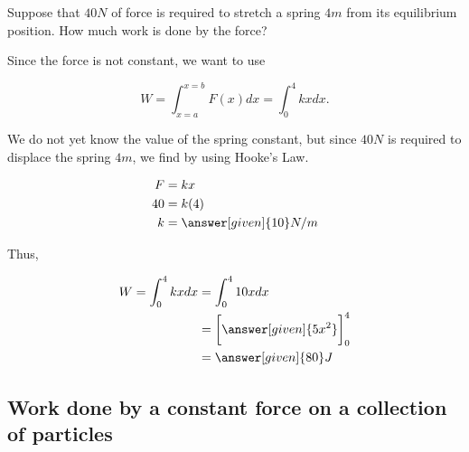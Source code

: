 \documentclass{ximera}
\begin{document}
\begin{example}
Suppose that $40 N$ of force is required to stretch a spring $4m$ from its equilibrium position.  How much work is done by the force?

\begin{explanation}
Since the force is not constant, we want to use

\[W=\int_{x=a}^{x=b} F(x) dx = \int_0^4 kx dx . \]

We do not yet know the value of the spring constant, but since $40 N$ is required to displace the spring $4m$, we find by using Hooke's Law.

\begin{align*}
F &= kx \\
40 &= k(4) \\
k &= \answer[given]{10} N/m
\end{align*}

Thus, 

\begin{align*}
W= \int_0^4 kx dx &= \int_0^4 10x dx \\
&= \bigg[\answer[given]{5x^2}\bigg]_0^4 \\
&= \answer[given]{80} J
\end{align*}


\end{explanation}

\end{example}




\subsection{Work done by a constant force on a collection of particles}

  
\end{document}

